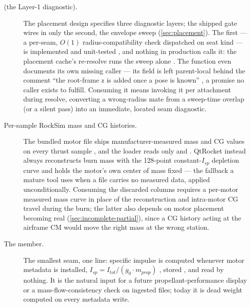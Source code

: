 \begin{description}
\item[ (the Layer-1 diagnostic).] The placement design specifies three
diagnostic layers; the shipped gate wires in only the second, the envelope sweep
(\cref{sec:placement}). The first --- a per-seam, $O(1)$ radius-compatibility check
dispatched on seat kind --- is implemented  and
unit-tested , and nothing in production calls
it: the placement cache's re-resolve runs the sweep alone .
The function even documents its own missing caller --- its  field is left
parent-local behind the comment ``the root-frame z is added once a pose is known''
, a promise no caller exists to fulfill. Consuming it
means invoking it per attachment during resolve, converting a wrong-radius mate from a
sweep-time overlap (or a silent pass) into an immediate, located seam diagnostic.

\item[Per-sample RockSim mass and CG histories.] The bundled motor file ships
manufacturer-measured mass and CG values on every thrust sample
, and the loader reads only  and 
. QtRocket instead always reconstructs burn mass with
the 128-point constant-$I_{sp}$ depletion curve  and holds
the motor's own center of mass fixed  --- the fallback a
mature tool uses when a file carries no measured data, applied unconditionally. Consuming
the discarded columns requires a per-motor measured mass curve in place of the
reconstruction and intra-motor CG travel during the burn; the latter also depends on motor
placement becoming real (\cref{sec:incomplete-partial}), since a CG history acting at the
airframe CM would move the right mass at the wrong station.

\item[The  member.] The smallest seam, one line: specific impulse is computed
whenever motor metadata is installed, $I_{sp} = I_{tot} / (g_0 \cdot m_{prop})$
, stored , and read by nothing.
It is the natural input for a future propellant-performance display or a
mass-flow-consistency check on ingested files; today it is dead weight computed on every
metadata write.

\end{description}

